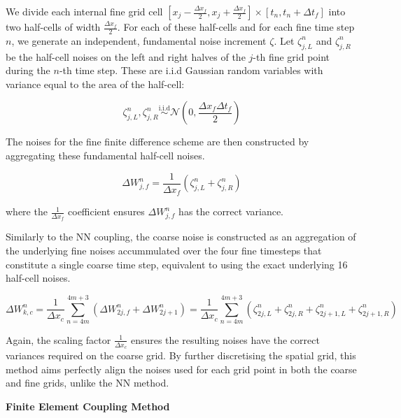 We divide each internal fine grid cell 
$[x_{j}-\frac{\Delta x_f}{2}, 
x_{j}+\frac{\Delta x_f}{2}]
\times [t_n, t_n + \Delta t_f]$ into
two half-cells of width $\frac{\Delta x_f}{2}$.
For each of these half-cells and for each fine time
step $n$, we generate an independent, fundamental 
noise increment $\zeta$. Let $\zeta_{j,L}^n$ and 
$\zeta_{j,R}^n$ be the half-cell noises on the left 
and right halves of the $j$-th fine grid point
during the $n$-th time step. These are 
i.i.d Gaussian random variables with variance 
equal to the area of the half-cell:

\begin{equation*}
    \zeta_{j,L}^n, \zeta_{j, R}^n 
    \overset{\mathrm{i.i.d}}{\sim} 
    \mathcal{N}(0, \frac{\Delta x_f \Delta t_f}{2})
\end{equation*}

The noises for the fine finite difference 
scheme are then constructed by aggregating 
these fundamental half-cell noises.

\begin{equation*}
    \Delta W_{j,f}^n = \frac{1}{\Delta x_f} 
    (\zeta_{j,L}^n + \zeta_{j,R}^n)
\end{equation*}

where the $\frac{1}{\Delta x_f}$ coefficient 
ensures $\Delta W_{j,f}^n$ has the correct variance. 

Similarly to the NN coupling, the coarse noise 
is constructed as an aggregation of 
the underlying fine noises accummulated over the
four fine timesteps that constitute a single
coarse time step, equivalent to using the 
exact underlying 16 half-cell noises.

\begin{equation*}
    \Delta W_{k, c}^n = \frac{1}{\Delta x_c}
    \sum_{n=4m}^{4m+3} \left(\Delta W_{2j,f}^n + 
    \Delta W_{2j+1}^n\right) = \frac{1}{\Delta x_c}
    \sum_{n=4m}^{4m+3} \left(\zeta_{2j,L}^n + 
    \zeta_{2j, R}^n + \zeta_{2j+1,L}^n + 
    \zeta_{2j+1,R}^n\right)
\end{equation*}

Again, the scaling factor
$\frac{1}{\Delta x_c}$ ensures the resulting
noises have the correct variances required on 
the coarse grid. 
By further discretising the spatial grid, 
this method aims perfectly align the noises 
used for each grid point in both the coarse
and fine grids, unlike the NN method.
\newline

\textbf{Finite Element Coupling Method}

